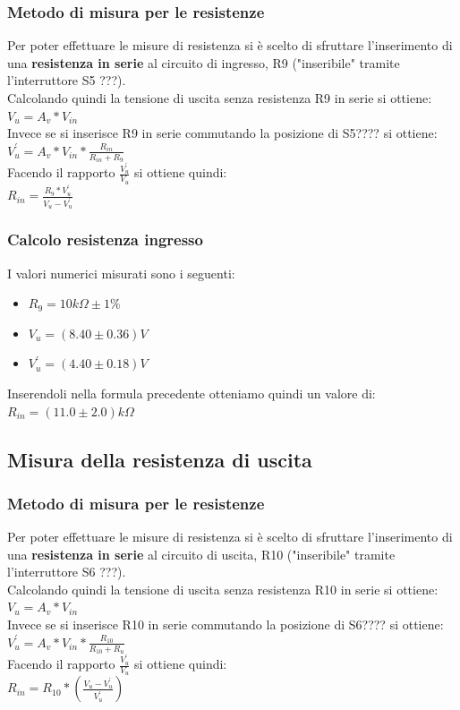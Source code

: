 \documentclass{article}
\begin{document}
\subsubsection{Metodo di misura per le resistenze}
Per poter effettuare le misure di resistenza si è scelto di sfruttare l'inserimento di una \textbf{resistenza in serie} al circuito di ingresso, R9 ("inseribile" tramite l'interruttore S5 ???).\\Calcolando quindi la tensione di uscita senza resistenza R9 in serie si ottiene:\\
\large $V_{u} = A_{v} * V_{in}$ \normalsize \\ Invece se si inserisce R9 in serie commutando la posizione di S5???? si ottiene:\\
\large $ V_{u}^{'} = A_{v} * V_{in} * \frac{R_{in}}{R_{in} + R_9} $ \normalsize \\ Facendo il rapporto \large $\frac{V_{u}^{'}}{{V_u}}$ \normalsize si ottiene quindi: \\ \large $R_{in} = \frac{R_9 * V_{u}^{'}}{V_u - V_{u}^{'}} $

\subsubsection{Calcolo resistenza ingresso}
I valori numerici misurati sono i seguenti:
\begin{itemize}
	\item \large $R_{9} = 10k\Omega \pm 1\%$
	\item \large $V_{u} = (8.40 \pm 0.36)V$
	\item \large $V_{u}^{'} = (4.40 \pm 0.18)V$
\end{itemize}
Inserendoli nella formula precedente otteniamo quindi un valore di: \\ \large $R_{in} = (11.0 \pm 2.0)k\Omega$

\subsection{Misura della resistenza di uscita}
\subsubsection{Metodo di misura per le resistenze}
\normalsize Per poter effettuare le misure di resistenza si è scelto di sfruttare l'inserimento di una \textbf{resistenza in serie} al circuito di uscita, R10 ("inseribile" tramite l'interruttore S6 ???).\\Calcolando quindi la tensione di uscita senza resistenza R10 in serie si ottiene:\\
\large $V_{u} = A_{v} * V_{in}$ \normalsize \\ Invece se si inserisce R10 in serie commutando la posizione di S6???? si ottiene:\\
\large $ V_{u}^{'} = A_{v} * V_{in} * \frac{R_{10}}{R_{10} + R_u} $ \normalsize \\ Facendo il rapporto \large $\frac{V_{u}^{'}}{{V_u}}$ \normalsize si ottiene quindi: \\ \large $R_{in} = R_{10} * (\frac{V_{u}-V_{u}^{'}}{V_{u}^{'}}) $ \normalsize
\end{document}
